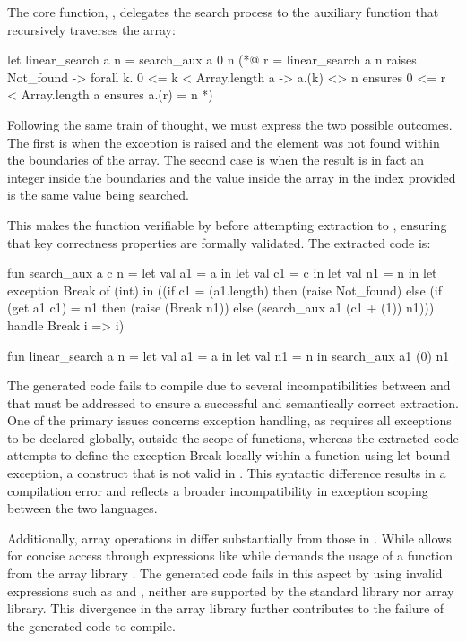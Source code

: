 The core function, , delegates the search process to the auxiliary function that recursively traverses 
the array:

\begin{gospell}
let linear_search a n = search_aux a 0 n
(*@
  r = linear_search a n
  raises Not_found -> forall k. 0 <= k < Array.length a -> a.(k) <> n
  ensures 0 <= r < Array.length a
  ensures a.(r) = n
*)
\end{gospell}

Following the same train of thought, we must express the two possible outcomes. The first is when the  exception
is raised and the element was not found within the boundaries of the array. The second case is when the result is in fact an integer
inside the boundaries and the value inside the array in the index provided is the same value being searched.

This makes the function verifiable by \whythree before attempting extraction to \cml, ensuring that key correctness properties are 
formally validated. The extracted code is:

\begin{cakeml}
fun search_aux a c n = let val a1 = a in
  let val c1 = c in
  let val n1 = n in
  let exception Break of (int) in
  ((if c1 = (a1.length) then (raise Not_found) 
    else (if (get a1 c1) = n1 then (raise (Break n1)) 
          else (search_aux a1 (c1 + (1)) n1)))
  handle   Break i => i)

fun linear_search a n =
  let val a1 = a in let val n1 = n in search_aux a1 (0) n1
\end{cakeml}

The generated \cml code fails to compile due to several incompatibilities between \ocaml and \cml that must be addressed 
to ensure a successful and semantically correct extraction. One of the primary issues concerns exception handling, as \cml 
requires all exceptions to be declared globally, outside the scope of functions, whereas the extracted code attempts to define 
the exception Break locally within a function using let-bound exception, a construct that is not valid in \cml. This syntactic 
difference results in a compilation error and reflects a broader incompatibility in exception scoping between the two languages.

Additionally, array operations in \cml differ substantially from those in \ocaml. While \ocaml allows for concise access through 
expressions like  while \cml demands the usage of a function from the array library . 
The generated code fails in this aspect by using invalid expressions such as  and , 
neither are supported by the \cml standard library nor array library. This divergence in the array library further contributes 
to the failure of the generated code to compile.

